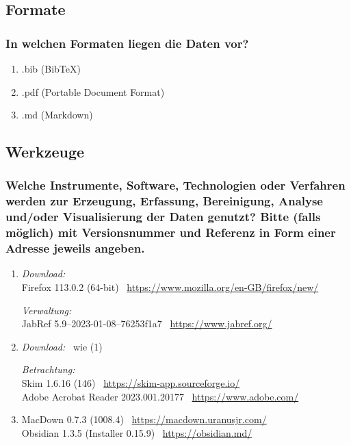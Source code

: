 \documentclass[%
  11pt,
  DIV=16,
  a4paper,
  BCOR=15mm,
  twoside=on,
  bibliography=totoc,
  headings=normal,
  numbers=noendperiod,
]{scrartcl}
\begin{document}
\goodbreak
\subsection{Formate}

\subsubsection{In welchen Formaten liegen die Daten vor?}
\label{sec:3.3.1}

\begin{enumerate}[(1)]
  \item
    .bib (BibTeX)
  \item
    .pdf (Portable Document Format)
  \item
    .md (Markdown)
\end{enumerate}

\subsection{Werkzeuge}

\subsubsection{Welche Instrumente, Software, Technologien oder Verfahren werden zur Erzeugung, Erfassung, Bereinigung, Analyse und/oder Visualisierung der Daten genutzt? Bitte (falls möglich) mit Versionsnummer und Referenz in Form einer Adresse jeweils angeben.}

\begin{enumerate}[(1)]
  \item
    \emph{Download:} \\
    Firefox 113.0.2 (64-bit)~
    \url{https://www.mozilla.org/en-GB/firefox/new/}
    
    \emph{Verwaltung:} \\
    JabRef 5.9--2023-01-08--76253f1a7~ 
    \url{https://www.jabref.org/}
  \item
    \emph{Download:}~ wie (1)
    
    \emph{Betrachtung:} \\
    Skim 1.6.16 (146)~
    \url{https://skim-app.sourceforge.io/}\\
    Adobe Acrobat Reader 2023.001.20177~
    \url{https://www.adobe.com/}
  \item
    MacDown 0.7.3 (1008.4)~
    \url{https://macdown.uranusjr.com/}\\
    Obsidian 1.3.5 (Installer 0.15.9)~
    \url{https://obsidian.md/}
\end{enumerate}
\end{document}
